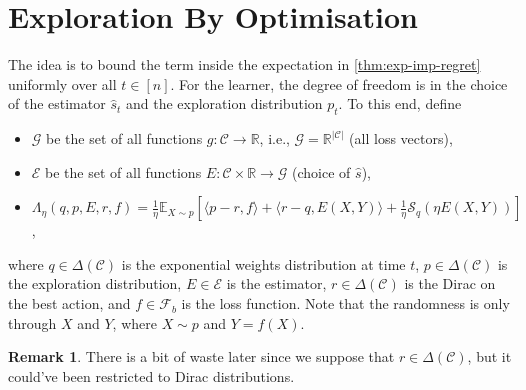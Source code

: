 \documentclass{article}
\theoremstyle{plain}
\theoremstyle{definition}
\newtheorem{remark}[theorem]{Remark}
\theoremstyle{remark}
\newcommand{\R}{\mathbb R}
\newcommand{\E}{\mathbb E}
\newcommand{\cE}{\mathcal E}
\newcommand{\cF}{\mathcal F}
\newcommand{\cS}{\mathcal S}
\newcommand{\cC}{\mathcal C}
\newcommand{\cG}{\mathcal G}
\theoremstyle{definition}
\begin{document}
\section{Exploration By Optimisation}
The idea is to bound the term inside the expectation in \cref{thm:exp-imp-regret} uniformly over all $t \in [n]$.
For the learner, the degree of freedom is in the choice of the estimator $\hat{s}_t$ and the exploration distribution $p_t$.
To this end, define
\begin{itemize}
    \item $\cG$ be the set of all functions $g:\cC \to \R$, i.e., $\cG = \R^{|\cC|}$ (all loss vectors),
    \item $\cE$ be the set of all functions $E: \cC \times \R \to \cG$ (choice of $\hat{s}$),
    \item
          $\Lambda_\eta(q, p, E, r, f) =
              \frac{1}{\eta}
              \E_{X\sim p}\!\left[
                  \langle p - r, f \rangle
                  + \langle r - q, E(X, Y) \rangle
                  + \frac{1}{\eta} \cS_q(\eta E(X, Y))
                  \right]$,
\end{itemize}
where $q \in \Delta(\cC)$ is the exponential weights distribution at time $t$, $p \in \Delta(\cC)$ is the exploration distribution, $E \in \cE$ is the estimator, $r \in \Delta(\cC)$ is the Dirac on the best action, and $f \in \cF_b$ is the loss function.
Note that the randomness is only through $X$ and $Y$, where $X \sim p$ and $Y = f(X)$.
\begin{remark}
    There is a bit of waste later since we suppose that $r \in \Delta(\cC)$, but it could've been restricted to Dirac distributions.
\end{remark}
\end{document}
